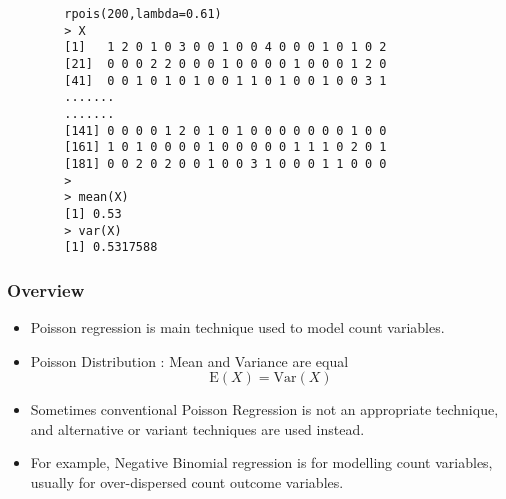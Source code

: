 \documentclass[MASTER.tex]{subfiles}
\begin{document}
\begin{frame}[fragile]
	\begin{framed}
		\begin{verbatim}
		rpois(200,lambda=0.61)
		> X
		[1]   1 2 0 1 0 3 0 0 1 0 0 4 0 0 0 1 0 1 0 2
		[21]  0 0 0 2 2 0 0 0 1 0 0 0 0 1 0 0 0 1 2 0
		[41]  0 0 1 0 1 0 1 0 0 1 1 0 1 0 0 1 0 0 3 1
		.......
		.......
		[141] 0 0 0 0 1 2 0 1 0 1 0 0 0 0 0 0 0 1 0 0
		[161] 1 0 1 0 0 0 0 1 0 0 0 0 0 1 1 1 0 2 0 1
		[181] 0 0 2 0 2 0 0 1 0 0 3 1 0 0 0 1 1 0 0 0
		>
		> mean(X)
		[1] 0.53
		> var(X)
		[1] 0.5317588
		\end{verbatim}
	\end{framed}
\end{frame}
\begin{frame}
\frametitle{Overview}
\Large
\begin{itemize}
\item  Poisson regression is main technique used to model count variables.

\item Poisson Distribution : Mean and Variance are equal
\[ \mathrm{E}(X)  = \mathrm{Var}(X) \]


\item  Sometimes conventional Poisson Regression is not an appropriate technique, and alternative or variant techniques are used instead.


\item  For example, Negative Binomial regression is for modelling count variables, usually for over-dispersed count outcome variables.
\end{itemize}
\end{frame}
\end{document}
